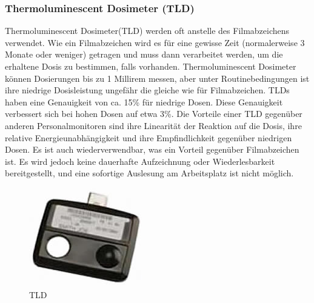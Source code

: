 {\subsubsection{Thermoluminescent Dosimeter (TLD)}
Thermoluminescent Dosimeter(TLD) werden oft anstelle des Filmabzeichens verwendet. Wie ein Filmabzeichen wird es für eine gewisse Zeit (normalerweise 3 Monate oder weniger) getragen und muss dann verarbeitet werden, um die erhaltene Dosis zu bestimmen, falls vorhanden. Thermoluminescent Dosimeter können Dosierungen bis zu 1 Millirem messen, aber unter Routinebedingungen ist ihre niedrige Dosisleistung ungefähr die gleiche wie für Filmabzeichen. TLDs haben eine Genauigkeit von ca. 15\% für niedrige Dosen. Diese Genauigkeit verbessert sich bei hohen Dosen auf etwa 3\%. Die Vorteile einer TLD gegenüber anderen Personalmonitoren sind ihre Linearität der Reaktion auf die Dosis, ihre relative Energieunabhängigkeit und ihre Empfindlichkeit gegenüber niedrigen Dosen. Es ist auch wiederverwendbar, was ein Vorteil gegenüber Filmabzeichen ist. Es wird jedoch keine dauerhafte Aufzeichnung oder Wiederlesbarkeit bereitgestellt, und eine sofortige Auslesung am Arbeitsplatz ist nicht möglich.
\begin{figure}[htb]
\centering
   \includegraphics[scale=0.9]{img/TLD.jpg}
  \caption{TLD}
  \label{fig:TLD}
\end{figure}
}

